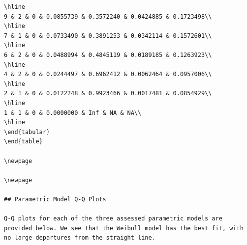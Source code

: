 \documentclass[
]{article}
\begin{document}
\begin{verbatim}
\hline
9 & 2 & 0 & 0.0855739 & 0.3572240 & 0.0424885 & 0.1723498\\
\hline
7 & 1 & 0 & 0.0733490 & 0.3891253 & 0.0342114 & 0.1572601\\
\hline
6 & 2 & 0 & 0.0488994 & 0.4845119 & 0.0189185 & 0.1263923\\
\hline
4 & 2 & 0 & 0.0244497 & 0.6962412 & 0.0062464 & 0.0957006\\
\hline
2 & 1 & 0 & 0.0122248 & 0.9923466 & 0.0017481 & 0.0854929\\
\hline
1 & 1 & 0 & 0.0000000 & Inf & NA & NA\\
\hline
\end{tabular}
\end{table}

\newpage

\newpage

## Parametric Model Q-Q Plots

Q-Q plots for each of the three assessed parametric models are provided below. We see that the Weibull model has the best fit, with no large departures from the straight line. 


\end{verbatim}
\end{document}

